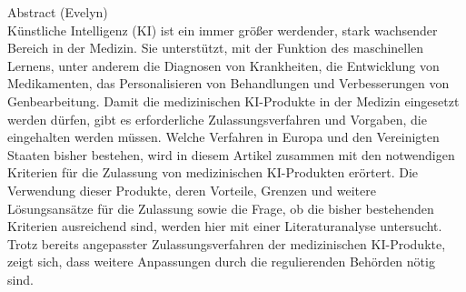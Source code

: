 {\centering
{\large Abstract (Evelyn)\\}
}
Künstliche Intelligenz (KI) ist ein immer größer werdender, stark wachsender Bereich in der Medizin.
Sie unterstützt, mit der Funktion des maschinellen Lernens,
unter anderem die Diagnosen von Krankheiten, die Entwicklung von Medikamenten,
das Personalisieren von Behandlungen und Verbesserungen von Genbearbeitung.
Damit die medizinischen KI-Produkte in der Medizin eingesetzt werden dürfen,
gibt es erforderliche Zulassungsverfahren und Vorgaben, die eingehalten werden müssen.
Welche Verfahren in Europa und den Vereinigten Staaten bisher bestehen,
wird in diesem Artikel zusammen mit den notwendigen Kriterien
für die Zulassung von medizinischen KI-Produkten erörtert.
Die Verwendung dieser Produkte, deren Vorteile,
Grenzen und weitere Lösungsansätze für die Zulassung sowie die Frage,
ob die bisher bestehenden Kriterien ausreichend sind,
werden hier mit einer Literaturanalyse untersucht.
Trotz bereits angepasster Zulassungsverfahren der medizinischen KI-Produkte,
zeigt sich,
dass weitere Anpassungen durch die regulierenden Behörden nötig sind.